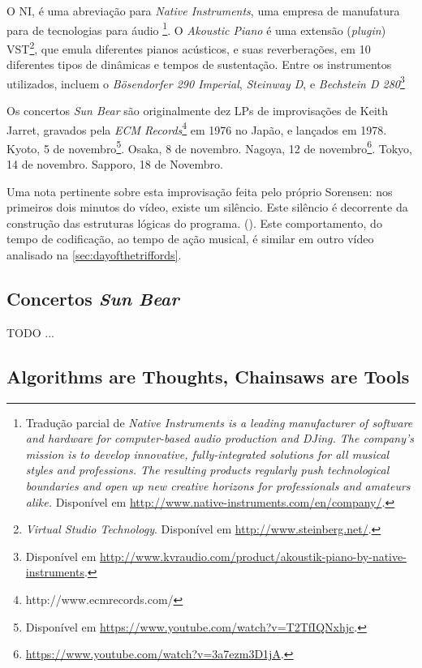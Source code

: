 \documentclass[
	12pt,				%
	openright,			%
	twoside,			%
	a4paper,			%
	english,			%
	french,				%
	spanish,			%
        italian,                        %
	brazil				%
	]{abntex2}
\begin{document}
O NI, é uma abreviação para \emph{Native Instruments}, uma empresa de manufatura para  de tecnologias para áudio \footnote{Tradução parcial  de \emph{Native Instruments is a leading manufacturer of software and hardware for computer-based audio production and DJing. The company's mission is to develop innovative, fully-integrated solutions for all musical styles and professions. The resulting products regularly push technological boundaries and open up new creative horizons for professionals and amateurs alike.} Disponível em \url{http://www.native-instruments.com/en/company/}.}. O \emph{Akoustic Piano} é uma extensão (\emph{plugin}) VST\footnote{\emph{Virtual Studio Technology}. Disponível em \url{http://www.steinberg.net/}.}, que emula diferentes pianos acústicos, e suas reverberações, em 10 diferentes tipos de dinâmicas e tempos de sustentação. Entre os instrumentos utilizados, incluem o \emph{Bösendorfer 290 Imperial}, \emph{Steinway D}, e \emph{Bechstein D 280}\footnote{Disponível em \url{http://www.kvraudio.com/product/akoustik-piano-by-native-instruments}.}

Os concertos \emph{Sun Bear} são originalmente dez LPs  de improvisações de Keith Jarret, gravados pela \emph{ECM Records}\footnote{http://www.ecmrecords.com/} em 1976 no Japão, e lançados em 1978. Kyoto, 5 de novembro\footnote{Disponível em \url{https://www.youtube.com/watch?v=T2TfIQNxhjc}.}. Osaka, 8 de novembro. Nagoya, 12 de novembro\footnote{\url{https://www.youtube.com/watch?v=3a7ezm3D1jA}.}. Tokyo, 14 de novembro. Sapporo, 18 de Novembro.

Uma nota pertinente sobre esta improvisação feita pelo próprio Sorensen: nos primeiros dois minutos do vídeo, existe um silêncio. Este silêncio é decorrente da construção das estruturas lógicas do programa. (). Este comportamento, do tempo de codificação, ao tempo de ação musical, é similar em outro vídeo analisado na  \autoref{sec:dayofthetriffords}. 

\subsection{Concertos \emph{Sun Bear}}\label{sec:sunbear}

TODO ...

\subsection{Algorithms are Thoughts, Chainsaws are Tools}
\end{document}
